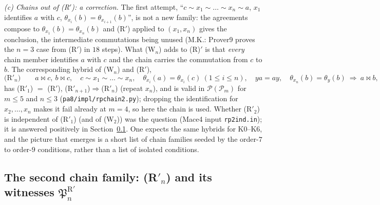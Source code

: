 \documentclass[11pt]{amsart}
\theoremstyle{definition}
\renewcommand{\P}{\mathcal{P}}
\newcommand{\mt}{\bowtie}   %
\begin{document}
\emph{(c) Chains out of (R$'$): a correction.} The first attempt, ``$c\sim x_1\sim\dots\sim x_n\sim a$, $x_1$ identifies $a$ with $c$, $\theta_{x_i}(b)=\theta_{x_{i+1}}(b)$'', is not a new family: the agreements compose to $\theta_{x_1}(b)=\theta_{x_n}(b)$ and (R$'$) applied to $(x_1,x_n)$ gives the conclusion, the intermediate commutations being unused (M.K.: Prover9 proves the $n=3$ case from (R$'$) in $18$ steps). What (W$_n$) adds to (R)$'$ is that \emph{every} chain member identifies $a$ with $c$ and the chain carries the commutation from $c$ to $b$. The corresponding hybrid of (W$_n$) and (R$'$),
\[
\text{(R$'_n$)}\qquad a\mt c,\ b\mt c,\quad c\sim x_1\sim\dots\sim x_n,\quad \theta_{x_i}(a)=\theta_{x_i}(c)\ (1\le i\le n),\quad ya=ay,\quad \theta_{x_n}(b)=\theta_y(b)\ \Longrightarrow\ a\mt b,
\]
has (R$'_1$) $=$ (R$'$), (R$'_{n+1}$)$\Rightarrow$(R$'_n$) (repeat $x_n$), and is valid in $\P(\P_m)$ for $m\le5$ and $n\le3$ (\texttt{pa8/impl/rpchain2.py}); dropping the identification for $x_2,\dots,x_n$ makes it fail already at $m=4$, so here the chain is used. Whether (R$'_2$) is independent of (R$'_1$) (and of (W$_2$)) was the question (Mace4 input \texttt{rp2ind.in}); it is answered positively in Section~\ref{subsec:rpfam}. One expects the same hybrids for K0--K6, and the picture that emerges is a short list of chain families seeded by the order-$7$ to order-$9$ conditions, rather than a list of isolated conditions.

\subsection{The second chain family: (R$'_n$) and its witnesses $\mathfrak P^{\mathrm R'}_n$}\label{subsec:rpfam}
\end{document}
